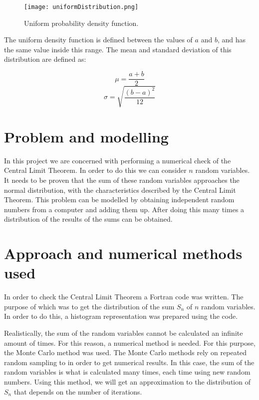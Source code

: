 \documentclass[12pt]{article}
\begin{document}
\begin{figure}[H]
	\centering
	\texttt{[image: uniformDistribution.png]}
	\caption{Uniform probability density function\cite{ref:uniformWiki}.}
	\label{ref:uniformCurve}
\end{figure}

The uniform density function is defined between the values of $a$ and $b$, and has the same value inside this range. The mean and standard deviation of this distribution are defined as\cite{ref:uniformStats}:

\begin{equation}
	\mu = \frac{a + b}{2}
	\label{eq:mean}
\end{equation}
\begin{equation}
	\sigma = \sqrt{\frac{{\left( b - a \right)}^{2}}{12}}
	\label{eq:standard}
\end{equation}


\section*{Problem and modelling}
In this project we are concerned with performing a numerical check of the Central Limit Theorem. In order to do this we can consider $n$ random variables. It needs to be proven that the sum of these random variables approaches the normal distribution, with the characteristics described by the Central Limit Theorem. This problem can be modelled by obtaining independent random numbers from a computer and adding them up. After doing this many times a distribution of the results of the sums can be obtained.


\section*{Approach and numerical methods used}
In order to check the Central Limit Theorem a Fortran code was written. The purpose of which was to get the distribution of the sum $S_{n}$ of $n$ random variables. In order to do this, a histogram representation was prepared using the code.

Realistically, the sum of the random variables cannot be calculated an infinite amount of times. For this reason, a numerical method is needed. For this purpose, the Monte Carlo method was used. The Monte Carlo methods rely on repeated random sampling to in order to get numerical results\cite{ref:monteCarloWiki}. In this case, the sum of the random variables is what is calculated many times, each time using new random numbers. Using this method, we will get an approximation to the distribution of $S_{n}$ that depends on the number of iterations.
\end{document}
